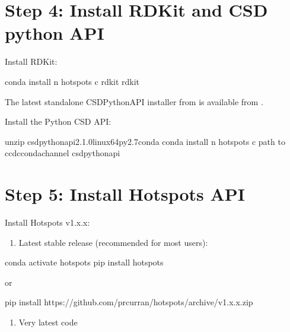 \documentclass[letterpaper,10pt,english]{sphinxmanual}
\begin{document}
\section{Step 4: Install RDKit and CSD python API}
\label{\detokenize{tutorial:step-4-install-rdkit-and-csd-python-api}}
Install RDKit:

\begin{sphinxVerbatim}[commandchars=\\\{\}]
conda install \PYGZhy{}n hotspots \PYGZhy{}c rdkit rdkit
\end{sphinxVerbatim}

The latest standalone CSD\sphinxhyphen{}Python\sphinxhyphen{}API installer from is available from .

Install the Python CSD API:

\begin{sphinxVerbatim}[commandchars=\\\{\}]
unzip csd\PYGZhy{}python\PYGZhy{}api\PYGZhy{}2.1.0\PYGZhy{}linux\PYGZhy{}64\PYGZhy{}py2.7\PYGZhy{}conda
conda install \PYGZhy{}n hotspots \PYGZhy{}c \PYGZlt{}path to ccdc\PYGZus{}conda\PYGZus{}channel\PYGZgt{} csd\PYGZhy{}python\PYGZhy{}api
\end{sphinxVerbatim}


\section{Step 5: Install Hotspots API}
\label{\detokenize{tutorial:step-5-install-hotspots-api}}
Install Hotspots v1.x.x:
\begin{enumerate}
%
\item {} 
Latest stable release (recommended for most users):

\end{enumerate}

\begin{sphinxVerbatim}[commandchars=\\\{\}]
conda activate hotspots
pip install hotspots
\end{sphinxVerbatim}

or

\begin{sphinxVerbatim}[commandchars=\\\{\}]
pip install https://github.com/prcurran/hotspots/archive/v1.x.x.zip
\end{sphinxVerbatim}
\begin{enumerate}
%
\setcounter{enumi}{1}
\item {} 
Very latest code

\end{enumerate}
\end{document}
